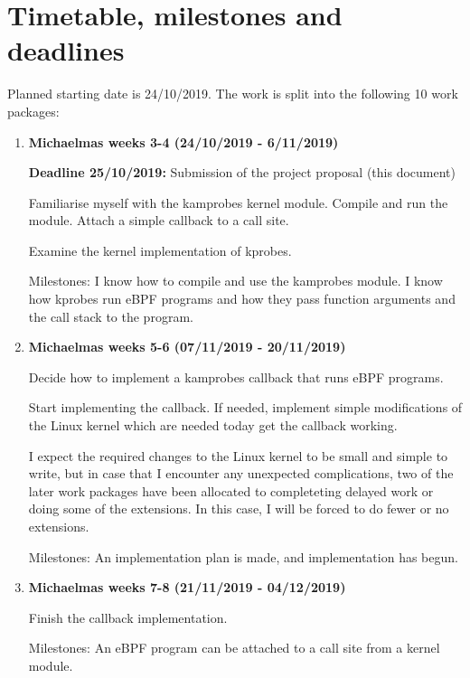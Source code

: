 \section*{Timetable, milestones and deadlines}

    Planned starting date is 24/10/2019. The work is split into the following 10 work packages:
    \begin{enumerate}

        \item {\bf Michaelmas weeks 3-4 (24/10/2019 - 6/11/2019)} 

            {\bf Deadline 25/10/2019:} Submission of the project proposal (this document) 

            Familiarise myself with the kamprobes kernel module. Compile and run the module.
            Attach a simple callback to a call site.

            Examine the kernel implementation of kprobes.

            Milestones: I know how to compile and use the kamprobes module.
            I know how kprobes run eBPF programs and how they pass function arguments and the call stack to the program.
        
        \item {\bf Michaelmas weeks 5-6 (07/11/2019 - 20/11/2019)} 

            Decide how to implement a kamprobes callback that runs eBPF programs.

            Start implementing the callback.
            If needed, implement simple modifications of the Linux kernel which are needed today
            get the callback working. 
            
            I expect the required changes to the Linux kernel to be small and simple to write, 
            but in case that I encounter any unexpected complications, two of the later work packages have been 
            allocated to completeting delayed work or doing some of the extensions. In this case, I will
            be forced to do fewer or no extensions.

            Milestones: An implementation plan is made, and implementation has begun.

        \item {\bf Michaelmas weeks 7-8 (21/11/2019 - 04/12/2019)}

            Finish the callback implementation.

            Milestones: An eBPF program can be attached to a call site from a kernel module.


\end{enumerate}
